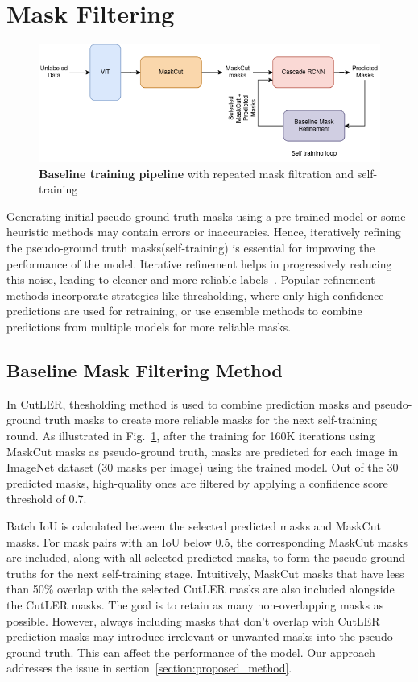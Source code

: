 \section{Mask Filtering}
\begin{figure}
	\centering
	\includegraphics[width=1\textwidth]{Images/main/baseline_method.png}
	\caption[\textbf{Baseline training pipeline}]{\textbf{Baseline training pipeline} with repeated mask filtration and self-training}
	\label{fig:baseline_training}
\end{figure}
Generating initial pseudo-ground truth masks using a pre-trained model or some heuristic methods may contain errors or inaccuracies. Hence, iteratively refining the pseudo-ground truth masks(self-training) is essential for improving the performance of the model. Iterative refinement helps in progressively reducing this noise, leading to cleaner and more reliable labels~\cite{xie2020selftrainingnoisystudentimproves}. Popular refinement methods incorporate strategies like thresholding, where only high-confidence predictions are used for retraining, or use ensemble methods to combine predictions from multiple models for more reliable masks.

\subsection{Baseline Mask Filtering Method}
\label{sec:baseline_mask_filteration}

In CutLER, thesholding method is used to combine prediction masks and pseudo-ground truth masks to create more reliable masks for the next self-training round. As illustrated in Fig.~\ref{fig:baseline_training}, after the training for 160K iterations using MaskCut masks as pseudo-ground truth, masks are predicted for each image in ImageNet dataset (30 masks per image) using the trained model. Out of the 30 predicted masks, high-quality ones are filtered by applying a confidence score threshold of 0.7.

Batch IoU is calculated between the selected predicted masks and MaskCut masks. For mask pairs with an IoU below 0.5, the corresponding MaskCut masks are included, along with all selected predicted masks, to form the pseudo-ground truths for the next self-training stage. Intuitively, MaskCut masks that have less than 50\% overlap with the selected CutLER masks are also included alongside the CutLER masks. The goal is to retain as many non-overlapping masks as possible. However, always including masks that don't overlap with CutLER prediction masks may introduce irrelevant or unwanted masks into the pseudo-ground truth. This can affect the performance of the model. Our approach addresses the issue in section~\ref{section:proposed_method}.

